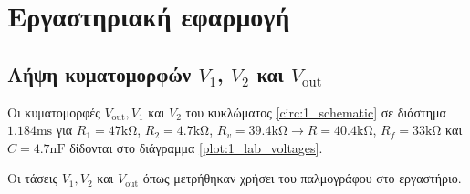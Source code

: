 
\section{Εργαστηριακή εφαρμογή}

	\subsection{Λήψη κυματομορφών $V_1$, $V_2$ και $V_{\mathrm{out}}$}
		Οι κυματομορφές $V_{\mathrm{out}}, V_1$ και $V_2$ του κυκλώματος \ref{circ:1_schematic} σε διάστημα  $1.184\unit{\milli\second}$ για $R_1=47\unit{\kilo\ohm}$, $R_2=4.7\unit{\kilo\ohm}$, $R_v=39.4\unit{\kilo\ohm}\rightarrow R=40.4\unit{\kilo\ohm}$, $R_f=33\unit{\kilo\ohm}$ και $C=4.7\unit{\nano\farad}$ δίδονται στο διάγραμμα \ref{plot:1_lab_voltages}.

		\begin{chart}[H]
			\begin{center}
				
				\caption{Οι τάσεις $V_1, V_2$ και $V_{\mathrm{out}}$ όπως μετρήθηκαν χρήσει του παλμογράφου στο εργαστήριο.}
				\label{plot:1_lab_voltages}
			\end{center}
		\end{chart}